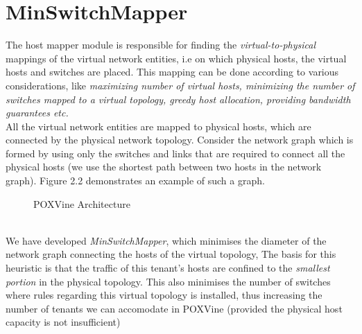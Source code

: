 \section{MinSwitchMapper}
The host mapper module is responsible for finding the \emph{virtual-to-physical} mappings of the virtual network entities, i.e on which physical hosts, the virtual hosts and switches are placed. This mapping can be done according to various considerations, like \emph{maximizing number of virtual hosts, minimizing the number of switches mapped to a virtual topology, greedy host allocation, providing bandwidth guarantees etc.} \\
All the virtual network entities are mapped to physical hosts, which are connected by the physical network topology. Consider the network graph which is formed by using only the switches and links that are required to connect all the physical hosts (we use the shortest path between two hosts in the network graph). Figure 2.2 demonstrates an example of such a graph. 
\begin{figure}
	\noindent
	\caption{POXVine Architecture}
\end{figure}
\\
We have developed \emph{MinSwitchMapper}, which minimises the diameter of the network graph connecting the hosts of the virtual topology, The basis for this heuristic is that the traffic of this tenant's hosts are confined to the \emph{smallest portion} in the physical topology. This also minimises the number of switches where rules regarding this virtual topology is installed, thus increasing the number of tenants we can accomodate in POXVine (provided the physical host capacity is not insufficient)

